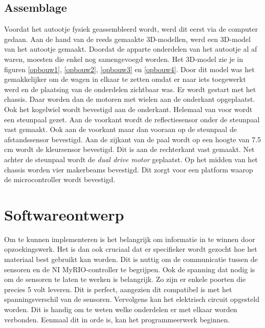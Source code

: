 \documentclass[a4paper,twoside,kulak]{kulakreport} %
\begin{document}
\subsection{Assemblage}
Voordat het autootje fysiek geassembleerd wordt, werd dit eerst via de computer gedaan. Aan de hand van de reeds gemaakte 3D-modellen, werd een 3D-model van het autootje gemaakt. Doordat de apparte onderdelen van het autootje al af waren, moesten die enkel nog samengevoegd worden. Het 3D-model zie je in figuren \ref{opbouw1}, \ref{opbouw2}, \ref{opbouw3} en \ref{opbouw4}.
Door dit model was het gemakkelijker om de wagen in elkaar te zetten omdat er naar iets toegewerkt werd en de plaatsing van de onderdelen zichtbaar was. Er wordt gestart met het chassis. Daar worden dan de motoren met wielen aan de onderkant opgeplaatst. Ook het kogelwiel wordt bevestigd aan de onderkant. Helemaal van voor wordt een steunpaal gezet. Aan de voorkant wordt de reflectiesensor onder de steunpaal vast gemaakt. Ook aan de voorkant maar dan vooraan op de steunpaal de afstandssensor bevestigd. Aan de zijkant van de paal wordt op een hoogte van 7.5 cm wordt de kleursensor bevestigd. Dit is aan de rechterkant vast gemaakt. Net achter de steunpaal wordt de {\it dual drive motor} geplaatst. Op het midden van het chassis worden vier makerbeams bevestigd. 
Dit zorgt voor een platform waarop de microcontroller wordt bevestigd.



\label{Assemblage}

\section{Softwareontwerp}\label{Softwareontwerp}

Om te kunnen implementeren is het belangrijk om informatie in te winnen door opzoekingswerk. Het is dan ook cruciaal dat er specifieker wordt gezocht hoe het materiaal best gebruikt kan worden.
Dit is nuttig om de communicatie tussen de sensoren en de NI MyRIO-controller te begrijpen. Ook de spanning dat nodig is om de sensoren te laten te werken is belangrijk. Zo zijn er enkele poorten die precies 5 volt leveren. Dit is perfect, aangezien dit compatibel is met het spanningsverschil van de sensoren. Vervolgens kan het elektrisch circuit opgesteld worden. Dit is handig om te weten welke onderdelen er met elkaar worden verbonden. Eenmaal dit in orde is, kan het programmeerwerk beginnen.
\end{document}
